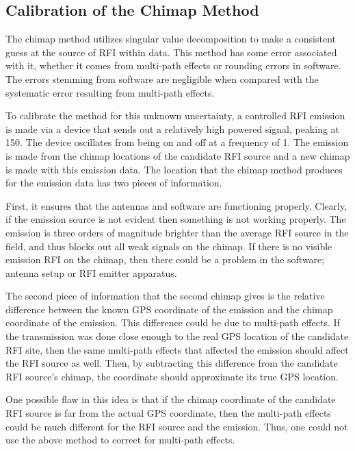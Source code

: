 \documentclass[a4paper,12pt]{article}
\begin{document}
      \subsection{Calibration of the Chimap Method}
      \label{sec:calibrationofthechimapmethod}

      The chimap method utilizes singular value decomposition to make a consistent guess at the source of RFI within data. This method has some error associated with it, whether it comes from multi-path effects or rounding errors in software. The errors stemming from software are negligible when compared with the systematic error resulting from multi-path effects.


      To calibrate the method for this unknown uncertainty, a controlled RFI emission is made via a device that sends out a relatively high powered signal, peaking at \unit{150}{\mega\hertz}. The device oscillates from being on and off at a frequency of \unit{1}{\hertz}. The emission is made from the chimap locations of the candidate RFI source and a new chimap is made with this emission data. The location that the chimap method produces for the emission data has two pieces of information.

      First, it ensures that the antennas and software are functioning properly. Clearly, if the emission source is not evident then something is not working properly. The emission is three orders of magnitude brighter than the average RFI source in the field, and thus blocks out all weak signals on the chimap. If there is no visible emission RFI on the chimap, then there could be a problem in the software; antenna setup or RFI emitter apparatus. 

      The second piece of information that the second chimap gives is the relative difference between the known GPS coordinate of the emission and the chimap coordinate of the emission. This difference could be due to multi-path effects. If the transmission was done close enough to the real GPS location of the candidate RFI site, then the same multi-path effects that affected the emission should affect the RFI source as well. Then, by subtracting this difference from the candidate RFI source’s chimap, the coordinate should approximate its true GPS location.

      One possible flaw in this idea is that if the chimap coordinate of the candidate RFI source is far from the actual GPS coordinate, then the multi-path effects could be much different for the RFI source and the emission. Thus, one could not use the above method to correct for multi-path effects. 
\end{document}
